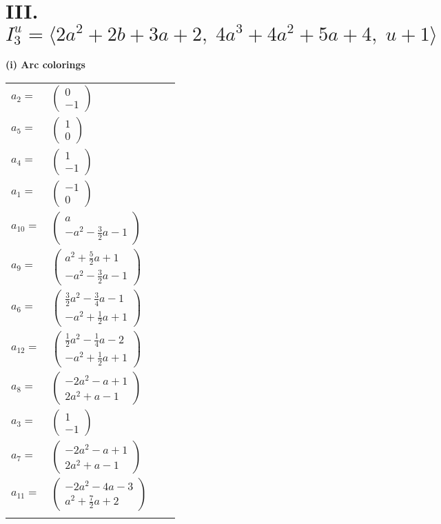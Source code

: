 \documentclass[1p]{elsarticle_modified}
\theoremstyle{definition}
\begin{document}
\centering \section*{III. $I^u_{3}= \langle 2 a^2+2 b+3 a+2,\;4 a^3+4 a^2+5 a+4,\;u+1 \rangle$}
\flushleft \textbf{(i) Arc colorings}\\
\begin{tabular}{m{7pt} m{180pt} m{7pt} m{180pt} }
\flushright $a_{2}=$&$\begin{pmatrix}0\\-1\end{pmatrix}$ \\
\flushright $a_{5}=$&$\begin{pmatrix}1\\0\end{pmatrix}$ \\
\flushright $a_{4}=$&$\begin{pmatrix}1\\-1\end{pmatrix}$ \\
\flushright $a_{1}=$&$\begin{pmatrix}-1\\0\end{pmatrix}$ \\
\flushright $a_{10}=$&$\begin{pmatrix}a\\- a^2-\frac{3}{2} a-1\end{pmatrix}$ \\
\flushright $a_{9}=$&$\begin{pmatrix}a^2+\frac{5}{2} a+1\\- a^2-\frac{3}{2} a-1\end{pmatrix}$ \\
\flushright $a_{6}=$&$\begin{pmatrix}\frac{3}{2} a^2-\frac{3}{4} a-1\\- a^2+\frac{1}{2} a+1\end{pmatrix}$ \\
\flushright $a_{12}=$&$\begin{pmatrix}\frac{1}{2} a^2-\frac{1}{4} a-2\\- a^2+\frac{1}{2} a+1\end{pmatrix}$ \\
\flushright $a_{8}=$&$\begin{pmatrix}-2 a^2- a+1\\2 a^2+a-1\end{pmatrix}$ \\
\flushright $a_{3}=$&$\begin{pmatrix}1\\-1\end{pmatrix}$ \\
\flushright $a_{7}=$&$\begin{pmatrix}-2 a^2- a+1\\2 a^2+a-1\end{pmatrix}$ \\
\flushright $a_{11}=$&$\begin{pmatrix}-2 a^2-4 a-3\\a^2+\frac{7}{2} a+2\end{pmatrix}$\\&\end{tabular}
\end{document}
